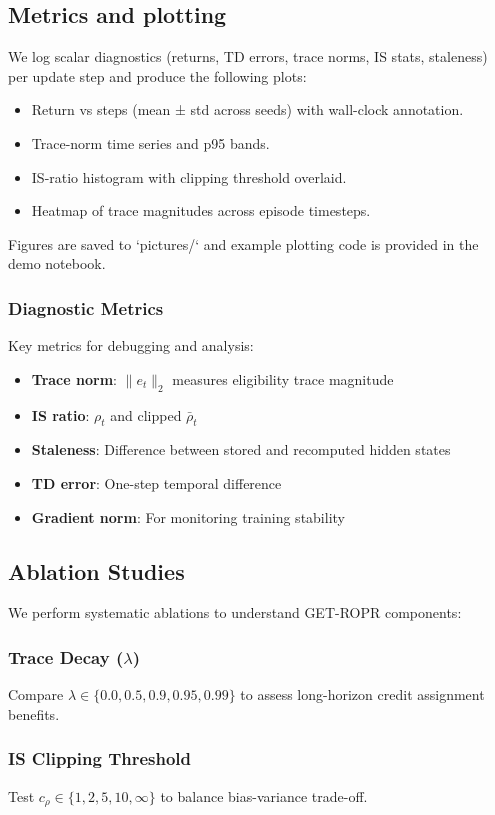 \documentclass{article}
\begin{document}
\subsection{Metrics and plotting}
We log scalar diagnostics (returns, TD errors, trace norms, IS stats, staleness) per update step and produce the following plots:
\begin{itemize}
  \item Return vs steps (mean ± std across seeds) with wall-clock annotation.
  \item Trace-norm time series and p95 bands.
  \item IS-ratio histogram with clipping threshold overlaid.
  \item Heatmap of trace magnitudes across episode timesteps.
\end{itemize}
Figures are saved to `pictures/` and example plotting code is provided in the demo notebook.

\subsubsection{Diagnostic Metrics}
Key metrics for debugging and analysis:
\begin{itemize}
  \item \textbf{Trace norm}: \(\|e_t\|_2\) measures eligibility trace magnitude
  \item \textbf{IS ratio}: \(\rho_t\) and clipped \(\bar{\rho}_t\)
  \item \textbf{Staleness}: Difference between stored and recomputed hidden states
  \item \textbf{TD error}: One-step temporal difference
  \item \textbf{Gradient norm}: For monitoring training stability
\end{itemize}

\subsection{Ablation Studies}
We perform systematic ablations to understand GET-ROPR components:

\subsubsection{Trace Decay (\(\lambda\))}
Compare \(\lambda \in \{0.0, 0.5, 0.9, 0.95, 0.99\}\) to assess long-horizon credit assignment benefits.

\subsubsection{IS Clipping Threshold}
Test \(c_\rho \in \{1, 2, 5, 10, \infty\}\) to balance bias-variance trade-off.
\end{document}
